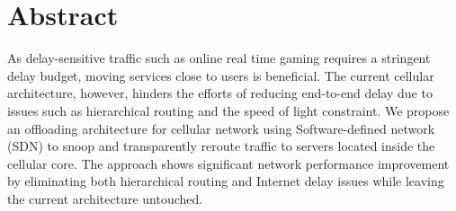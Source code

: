 \section*{Abstract}
As delay-sensitive traffic such as online real time gaming 
requires a stringent delay budget, moving services close 
to users is beneficial. The current cellular architecture, 
however, hinders the efforts of reducing end-to-end delay 
due to issues such as hierarchical routing and the speed 
of light constraint. We propose an offloading architecture for cellular network 
using Software-defined network (SDN) to snoop and transparently reroute traffic to
servers located inside the cellular core. The approach shows 
significant network performance improvement by 
eliminating both hierarchical routing and Internet delay issues 
while leaving the current architecture untouched.
 






